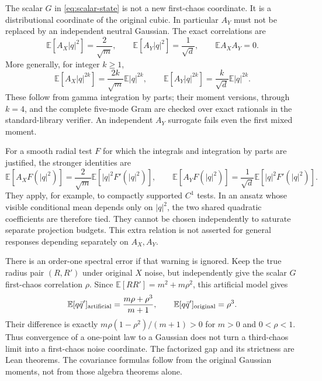 \documentclass[11pt]{article}
\newcommand{\E}{\mathbb E}
\begin{document}
The scalar $G$ in \eqref{eq:scalar-state} is not a new first-chaos coordinate.
It is a distributional coordinate of the original cubic. In particular $A_Y$
must not be replaced by an independent neutral Gaussian. The exact correlations
are
\[
 \E[A_X|q|^2]=\frac2{\sqrt m},\qquad
 \E[A_Y|q|^2]=\frac1{\sqrt d},\qquad \E A_XA_Y=0.
\]
More generally, for integer $k\ge1$,
\[
 \E[A_X|q|^{2k}]=\frac{2k}{\sqrt m}\E|q|^{2k},\qquad
 \E[A_Y|q|^{2k}]=\frac{k}{\sqrt d}\E|q|^{2k}.
\]
These follow from gamma integration by parts; their moment versions, through
$k=4$, and the complete five-mode Gram are checked over exact rationals in the
standard-library verifier. An independent $A_Y$ surrogate fails even the first
mixed moment.

For a smooth radial test $F$ for which the integrals and integration by parts
are justified, the stronger identities are
\[
 \E[A_XF(|q|^2)]=\frac2{\sqrt m}\E[|q|^2F'(|q|^2)],\qquad
 \E[A_YF(|q|^2)]=\frac1{\sqrt d}\E[|q|^2F'(|q|^2)].
\]
They apply, for example, to compactly supported $C^1$ tests. In an ansatz whose
visible conditional mean depends only on $|q|^2$, the two shared quadratic
coefficients are therefore tied. They cannot be chosen independently to
saturate separate projection budgets. This extra relation is not asserted for
general responses depending separately on $A_X,A_Y$.

There is an order-one spectral error if that warning is ignored. Keep the true
radius pair $(R,R')$ under original $X$ noise, but independently give the scalar
$G$ first-chaos correlation $\rho$. Since
$\E[RR']=m^2+m\rho^2$, this artificial model gives
\[
 \E[q\bar q']_{\rm artificial}=\frac{m\rho+\rho^3}{m+1},\qquad
 \E[q\bar q']_{\rm original}=\rho^3.
\]
Their difference is exactly $m\rho(1-\rho^2)/(m+1)>0$ for
$m>0$ and $0<\rho<1$. Thus convergence of a one-point law to a Gaussian does
not turn a third-chaos limit into a first-chaos noise coordinate. The factorized
gap and its strictness are Lean theorems. The covariance formulas follow from
the original Gaussian moments, not from those algebra theorems alone.
\end{document}

